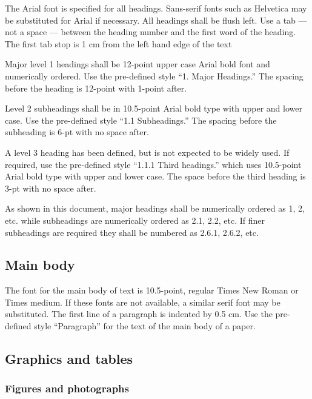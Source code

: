 The Arial font is specified for all headings. Sans-serif fonts such as Helvetica may be substituted for Arial if necessary. All headings shall be flush left. Use a tab --- not a space --- between the heading number and the first word of the heading. The first tab stop is 1 cm from the left hand edge of the text

Major level 1 headings shall be 12-point upper case Arial bold font and numerically ordered. Use the pre-defined style ``1. Major Headings.'' The spacing before the heading is 12-point with 1-point after.

Level 2 subheadings shall be in 10.5-point Arial bold type with upper and lower case. Use the pre-defined style ``1.1 Subheadings.'' The spacing before the subheading is 6-pt with no space after. 

A level 3 heading has been defined, but is not expected to be widely used. If required, use the pre-defined style ``1.1.1 Third headings.'' which uses 10.5-point Arial bold type with upper and lower case. The space before the third heading is 3-pt with no space after.

As shown in this document, major headings shall be numerically ordered as 1, 2, etc. while subheadings are numerically ordered as 2.1, 2.2, etc. If finer subheadings are required they shall be numbered as 2.6.1, 2.6.2, etc.

\subsection{Main body}

The font for the main body of text is 10.5-point, regular Times New Roman or Times medium. If these fonts are not available, a similar serif font may be substituted. The first line of a paragraph is indented by 0.5 cm. Use the pre-defined style ``Paragraph'' for the text of the main body of a paper.

\subsection{Graphics and tables}

\subsubsection{Figures and photographs}

